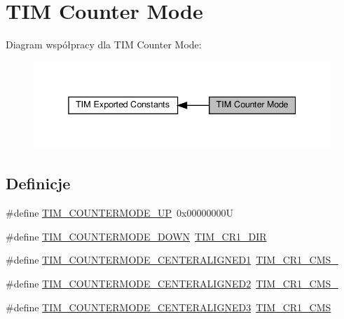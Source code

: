 \hypertarget{group___t_i_m___counter___mode}{}\section{T\+IM Counter Mode}
\label{group___t_i_m___counter___mode}
Diagram współpracy dla T\+IM Counter Mode\+:\nopagebreak
\begin{figure}[H]
\begin{center}
\leavevmode
\includegraphics[width=338pt]{group___t_i_m___counter___mode}
\end{center}
\end{figure}
\subsection*{Definicje}
\begin{DoxyCompactItemize}
\item 
\#define \hyperlink{group___t_i_m___counter___mode_ga9eb9ab91119c2c76d4db453d599c0b7d}{T\+I\+M\+\_\+\+C\+O\+U\+N\+T\+E\+R\+M\+O\+D\+E\+\_\+\+UP}~0x00000000U
\item 
\#define \hyperlink{group___t_i_m___counter___mode_ga5f590fdd7c41df7180b870bb76ff691c}{T\+I\+M\+\_\+\+C\+O\+U\+N\+T\+E\+R\+M\+O\+D\+E\+\_\+\+D\+O\+WN}~\hyperlink{group___peripheral___registers___bits___definition_gacea10770904af189f3aaeb97b45722aa}{T\+I\+M\+\_\+\+C\+R1\+\_\+\+D\+IR}
\item 
\#define \hyperlink{group___t_i_m___counter___mode_ga26d8e5236c35d85c2abaa482b5ec6746}{T\+I\+M\+\_\+\+C\+O\+U\+N\+T\+E\+R\+M\+O\+D\+E\+\_\+\+C\+E\+N\+T\+E\+R\+A\+L\+I\+G\+N\+E\+D1}~\hyperlink{group___peripheral___registers___bits___definition_ga83ca6f7810aba73dc8c12f22092d97a2}{T\+I\+M\+\_\+\+C\+R1\+\_\+\+C\+M\+S\+\_}
\item 
\#define \hyperlink{group___t_i_m___counter___mode_gae4517c68086ffa61a694576cec8fe634}{T\+I\+M\+\_\+\+C\+O\+U\+N\+T\+E\+R\+M\+O\+D\+E\+\_\+\+C\+E\+N\+T\+E\+R\+A\+L\+I\+G\+N\+E\+D2}~\hyperlink{group___peripheral___registers___bits___definition_gab3ee4adcde3c001d3b97d2eae1730ea9}{T\+I\+M\+\_\+\+C\+R1\+\_\+\+C\+M\+S\+\_}
\item 
\#define \hyperlink{group___t_i_m___counter___mode_gaf0c3edf6ea1ade3520ab4970e1fc6e92}{T\+I\+M\+\_\+\+C\+O\+U\+N\+T\+E\+R\+M\+O\+D\+E\+\_\+\+C\+E\+N\+T\+E\+R\+A\+L\+I\+G\+N\+E\+D3}~\hyperlink{group___peripheral___registers___bits___definition_ga352b3c389bde13dd6049de0afdd874f1}{T\+I\+M\+\_\+\+C\+R1\+\_\+\+C\+MS}
\end{DoxyCompactItemize}


